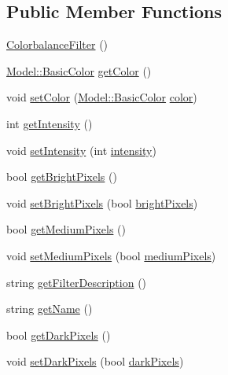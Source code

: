 \subsection*{Public Member Functions}
\begin{DoxyCompactItemize}
\item 
\hyperlink{classModel_1_1ColorbalanceFilter_a3ce5da414de521fd6406561b4b0c008b}{Colorbalance\+Filter} ()
\item 
\hyperlink{namespaceModel_a54742b2fc8f6a246926cbb87b7fae1a4}{Model\+::\+Basic\+Color} \hyperlink{classModel_1_1ColorbalanceFilter_a82ac188d01a7ce771cdb254e9eb70ba6}{get\+Color} ()
\item 
void \hyperlink{classModel_1_1ColorbalanceFilter_a707221b518c3ae5bf8ce16cc9b0d0054}{set\+Color} (\hyperlink{namespaceModel_a54742b2fc8f6a246926cbb87b7fae1a4}{Model\+::\+Basic\+Color} \hyperlink{classModel_1_1ColorbalanceFilter_af9c4a828f1030ef2b7d7ab814dd37cb9}{color})
\item 
int \hyperlink{classModel_1_1ColorbalanceFilter_a708995fb1b6acb31ee0dfb0f4881e5b5}{get\+Intensity} ()
\item 
void \hyperlink{classModel_1_1ColorbalanceFilter_ac8255ffbc46bb61acaa8fd23d0d260eb}{set\+Intensity} (int \hyperlink{classModel_1_1ColorbalanceFilter_a299ec0c42ccc5a2d79d1739428ac3210}{intensity})
\item 
bool \hyperlink{classModel_1_1ColorbalanceFilter_a1be0d343ed58d5d5bf7b816da375f190}{get\+Bright\+Pixels} ()
\item 
void \hyperlink{classModel_1_1ColorbalanceFilter_af0f286aa4c54fb1fd5813d02799da1cb}{set\+Bright\+Pixels} (bool \hyperlink{classModel_1_1ColorbalanceFilter_aae8fdd57ebeb891ebec4430ef4f71748}{bright\+Pixels})
\item 
bool \hyperlink{classModel_1_1ColorbalanceFilter_a71d3e0e416aa251b66678a14b4bfa1a1}{get\+Medium\+Pixels} ()
\item 
void \hyperlink{classModel_1_1ColorbalanceFilter_ab52d8f4be21efb3dbc9ef49adf755ace}{set\+Medium\+Pixels} (bool \hyperlink{classModel_1_1ColorbalanceFilter_a5d9db79c230cb372011e99b7a1799bc5}{medium\+Pixels})
\item 
string \hyperlink{classModel_1_1ColorbalanceFilter_a62b7b60e24f92234393b840b35808e06}{get\+Filter\+Description} ()
\item 
string \hyperlink{classModel_1_1ColorbalanceFilter_a11335e13e50af74108bf926dc1340b4b}{get\+Name} ()
\item 
bool \hyperlink{classModel_1_1ColorbalanceFilter_a81c4e5653e8217b741b4b183fe78abca}{get\+Dark\+Pixels} ()
\item 
void \hyperlink{classModel_1_1ColorbalanceFilter_a0215d6818f471e2d3ba48b52c2c3da5d}{set\+Dark\+Pixels} (bool \hyperlink{classModel_1_1ColorbalanceFilter_ab419b3e6552ab875fd167020998e8d45}{dark\+Pixels})
\end{DoxyCompactItemize}
